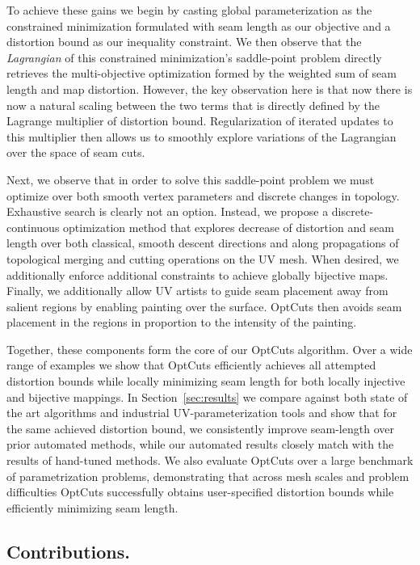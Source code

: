   To achieve these gains we begin by casting global parameterization as the constrained minimization formulated with seam length as our objective and a distortion bound as our inequality constraint. We then observe that the \emph{Lagrangian} of this constrained minimization's saddle-point problem directly retrieves the multi-objective optimization formed by the weighted sum of seam length and map distortion. However, the key observation here is that now there is now a natural scaling between the two terms that is directly defined by the Lagrange multiplier of distortion bound. Regularization of iterated updates to this multiplier then allows us to smoothly explore variations of the Lagrangian over the space of seam cuts. 
  
  Next, we observe that in order to solve this saddle-point problem we must optimize over both smooth vertex parameters and discrete changes in topology. Exhaustive search is clearly not an option. Instead, we propose a discrete-continuous optimization method that explores decrease of distortion and seam length over both classical, smooth descent directions and along propagations of topological merging and cutting operations on the UV mesh. When desired, we additionally enforce additional constraints to achieve globally bijective maps. Finally, we additionally allow UV artists to guide seam placement away from salient regions by enabling painting over the surface. OptCuts then avoids seam placement in the regions in proportion to the intensity of the painting.
  
  Together, these components form the core of our OptCuts algorithm. Over a wide range of examples we show that OptCuts efficiently achieves all attempted distortion bounds while locally minimizing seam length for both locally injective and bijective mappings. In Section~\ref{sec:results} we compare against both state of the art algorithms and industrial UV-parameterization tools and show that for the same achieved distortion bound, we consistently improve seam-length over prior automated methods, while our automated results closely match with the results of hand-tuned methods. We also evaluate OptCuts over a large benchmark of parametrization problems, demonstrating that across mesh scales and problem difficulties OptCuts successfully obtains user-specified distortion bounds while efficiently minimizing seam length. 
  
\subsection{Contributions.}

